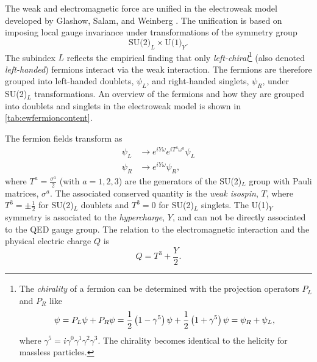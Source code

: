 The weak and electromagnetic force are unified in the electroweak model developed by Glashow, Salam, and Weinberg .
The unification is based on imposing local gauge invariance under transformations of the symmetry group
\begin{equation}
  \text{SU(2)}_L \times \text{U(1)}_Y.
\end{equation}
The subindex $L$ reflects the empirical finding that only \emph{left-chiral}\footnote{
  The \emph{chirality} of a fermion can be determined with the projection operators $P_L$ and $P_R$ like
  \begin{equation*}
    \psi       = P_L \psi + P_R \psi = \frac{1}{2} \left( 1 - \gamma^5 \right) \psi + \frac{1}{2} \left( 1 + \gamma^5 \right) \psi = \psi_R + \psi_L,                                \\
  \end{equation*}
  where $\gamma^5 = i\gamma^0\gamma^1\gamma^2\gamma^3$. The chirality becomes identical to the helicity for massless particles.
} (also denoted \emph{left-handed}) fermions interact via the weak interaction.
The fermions are therefore grouped into left-handed doublets, $\psi_L$, and right-handed singlets, $\psi_R$, under SU(2)$_L$ transformations. An overview of the fermions and how they are grouped into doublets and singlets in the electroweak model is shown in \cref{tab:ewfermioncontent}.

The fermion fields transform as
\begin{align}
  \psi_L & \rightarrow e^{iY\omega} e^{iT^a\omega^a} \psi_L \\
  \psi_R & \rightarrow e^{iY\omega} \psi_R,
\end{align}
where $T^a = \frac{\sigma^a}{2}$ (with $a = 1, 2, 3$) are the generators of the SU(2)$_L$ group with Pauli matrices, $\sigma^a$.
The associated conserved quantity is the \emph{weak isospin}, $T$, where $T^3 = \pm \frac{1}{2}$ for SU(2)$_L$ doublets and $T^3 = 0$ for SU(2)$_L$ singlets.
The U(1)$_Y$ symmetry is associated to the \emph{hypercharge}, $Y$, and can not be directly associated to the QED gauge group.
The relation to the electromagnetic interaction and the physical electric charge $Q$ is
\begin{equation}
  Q = T^3 + \frac{Y}{2}.
\end{equation}


